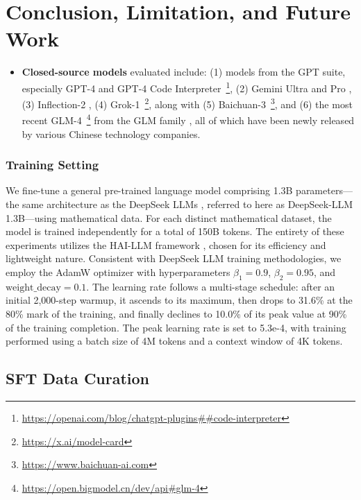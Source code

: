 \section{Conclusion, Limitation, and Future Work} 

\begin{itemize}[topsep=0pt]
    \item \textbf{Closed-source models} evaluated include: (1) models from the GPT suite, especially GPT-4 \citep{gpt4} and GPT-4 Code Interpreter~\footnote{\url{https://openai.com/blog/chatgpt-plugins\#\#code-interpreter}}, (2) Gemini Ultra and Pro \citep{gemini}, (3) Inflection-2 \citep{inflection-2}, (4) Grok-1~\footnote{\url{https://x.ai/model-card}}, along with (5) Baichuan-3~\footnote{\url{https://www.baichuan-ai.com}}, and (6) the most recent GLM-4~\footnote{\url{https://open.bigmodel.cn/dev/api\#glm-4}} from the GLM family \citep{glm}, all of which have been newly released by various Chinese technology companies.
\end{itemize}

\subsubsection{Training Setting}
\label{sec:quality-policy}
We fine-tune a general pre-trained language model comprising 1.3B parameters—the same architecture as the DeepSeek LLMs \citep{deepseek-llm}, referred to here as DeepSeek-LLM 1.3B—using mathematical data. For each distinct mathematical dataset, the model is trained independently for a total of 150B tokens. The entirety of these experiments utilizes the HAI-LLM framework \citep{haillm}, chosen for its efficiency and lightweight nature. Consistent with DeepSeek LLM training methodologies, we employ the AdamW optimizer \citep{adamW} with hyperparameters $\beta_1=0.9$, $\beta_2=0.95$, and $\mathrm{weight\_decay}=0.1$. The learning rate follows a multi-stage schedule: after an initial 2,000-step warmup, it ascends to its maximum, then drops to 31.6\% at the 80\% mark of the training, and finally declines to 10.0\% of its peak value at 90\% of the training completion. The peak learning rate is set to 5.3e-4, with training performed using a batch size of 4M tokens and a context window of 4K tokens.

\subsection{SFT Data Curation}

